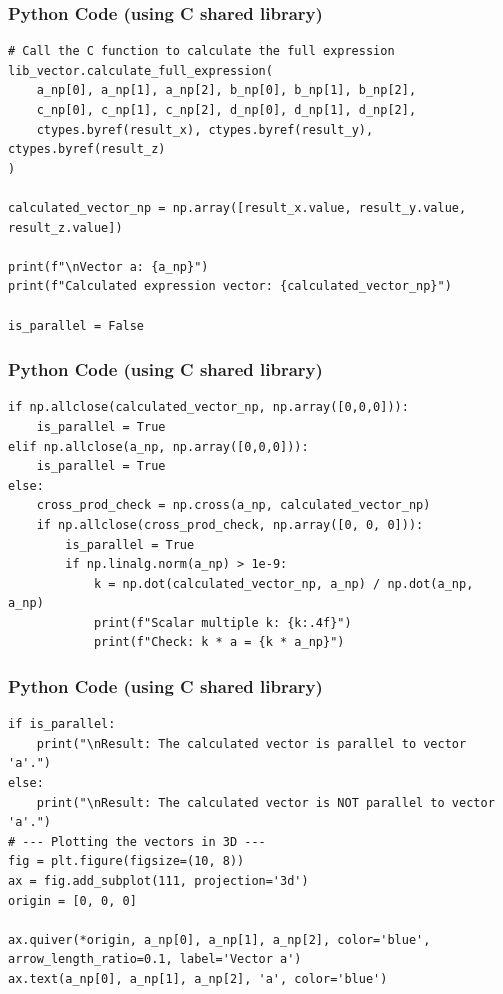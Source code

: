 \documentclass{beamer}
\begin{document}
\begin{frame}[fragile]
\frametitle{Python Code (using C shared library)}
\begin{lstlisting}
# Call the C function to calculate the full expression
lib_vector.calculate_full_expression(
    a_np[0], a_np[1], a_np[2], b_np[0], b_np[1], b_np[2],
    c_np[0], c_np[1], c_np[2], d_np[0], d_np[1], d_np[2],
    ctypes.byref(result_x), ctypes.byref(result_y), ctypes.byref(result_z)
)

calculated_vector_np = np.array([result_x.value, result_y.value, result_z.value])

print(f"\nVector a: {a_np}")
print(f"Calculated expression vector: {calculated_vector_np}")

is_parallel = False
    \end{lstlisting}
\end{frame}

\begin{frame}[fragile]
\frametitle{Python Code (using C shared library)}
\begin{lstlisting}
if np.allclose(calculated_vector_np, np.array([0,0,0])):
    is_parallel = True
elif np.allclose(a_np, np.array([0,0,0])):
    is_parallel = True
else:
    cross_prod_check = np.cross(a_np, calculated_vector_np)
    if np.allclose(cross_prod_check, np.array([0, 0, 0])):
        is_parallel = True
        if np.linalg.norm(a_np) > 1e-9:
            k = np.dot(calculated_vector_np, a_np) / np.dot(a_np, a_np)
            print(f"Scalar multiple k: {k:.4f}")
            print(f"Check: k * a = {k * a_np}")
\end{lstlisting}
\end{frame}

\begin{frame}[fragile]
\frametitle{Python Code (using C shared library)}
\begin{lstlisting}
if is_parallel:
    print("\nResult: The calculated vector is parallel to vector 'a'.")
else:
    print("\nResult: The calculated vector is NOT parallel to vector 'a'.")
# --- Plotting the vectors in 3D ---
fig = plt.figure(figsize=(10, 8))
ax = fig.add_subplot(111, projection='3d')
origin = [0, 0, 0]

ax.quiver(*origin, a_np[0], a_np[1], a_np[2], color='blue', arrow_length_ratio=0.1, label='Vector a')
ax.text(a_np[0], a_np[1], a_np[2], 'a', color='blue')
\end{lstlisting}
\end{frame}
\end{document}
